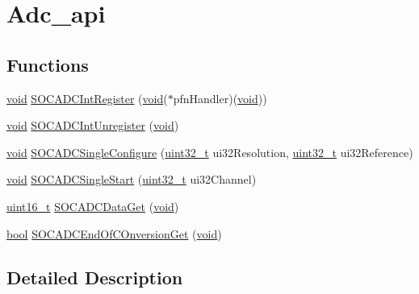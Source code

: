 \hypertarget{group__adc__api}{}\section{Adc\+\_\+api}
\label{group__adc__api}
\subsection*{Functions}
\begin{DoxyCompactItemize}
\item 
\hyperlink{usb__devapi_8h_afabf60e7f57651d6d595a02c75f07cd0}{void} \hyperlink{group__adc__api_ga95ca16f5e0870ecda7d0113b301e42dd}{S\+O\+C\+A\+D\+C\+Int\+Register} (\hyperlink{usb__devapi_8h_afabf60e7f57651d6d595a02c75f07cd0}{void}($\ast$pfn\+Handler)(\hyperlink{usb__devapi_8h_afabf60e7f57651d6d595a02c75f07cd0}{void}))
\item 
\hyperlink{usb__devapi_8h_afabf60e7f57651d6d595a02c75f07cd0}{void} \hyperlink{group__adc__api_ga5cad63f5d3e8f07798b1ce439440d0ae}{S\+O\+C\+A\+D\+C\+Int\+Unregister} (\hyperlink{usb__devapi_8h_afabf60e7f57651d6d595a02c75f07cd0}{void})
\item 
\hyperlink{usb__devapi_8h_afabf60e7f57651d6d595a02c75f07cd0}{void} \hyperlink{group__adc__api_ga96d92c8cc062f4c45831f5b128bc21da}{S\+O\+C\+A\+D\+C\+Single\+Configure} (\hyperlink{_p_e___types_8h_a33594304e786b158f3fb30289278f5af}{uint32\+\_\+t} ui32\+Resolution, \hyperlink{_p_e___types_8h_a33594304e786b158f3fb30289278f5af}{uint32\+\_\+t} ui32\+Reference)
\item 
\hyperlink{usb__devapi_8h_afabf60e7f57651d6d595a02c75f07cd0}{void} \hyperlink{group__adc__api_gaa59f17369b3f02c90197e3278a563cdd}{S\+O\+C\+A\+D\+C\+Single\+Start} (\hyperlink{_p_e___types_8h_a33594304e786b158f3fb30289278f5af}{uint32\+\_\+t} ui32\+Channel)
\item 
\hyperlink{_p_e___types_8h_a1f1825b69244eb3ad2c7165ddc99c956}{uint16\+\_\+t} \hyperlink{group__adc__api_ga774b502a5e44f376d1332c6a1a1c9af8}{S\+O\+C\+A\+D\+C\+Data\+Get} (\hyperlink{usb__devapi_8h_afabf60e7f57651d6d595a02c75f07cd0}{void})
\item 
\hyperlink{_p_e___types_8h_a97a80ca1602ebf2303258971a2c938e2}{bool} \hyperlink{group__adc__api_ga7b30a4921618f172b95d88347145a5a9}{S\+O\+C\+A\+D\+C\+End\+Of\+C\+Onversion\+Get} (\hyperlink{usb__devapi_8h_afabf60e7f57651d6d595a02c75f07cd0}{void})
\end{DoxyCompactItemize}


\subsection{Detailed Description}


